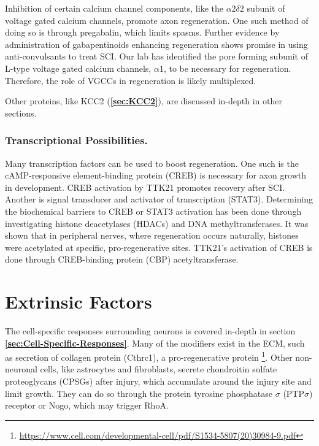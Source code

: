 \documentclass[12pt]{report}
\begin{document}
Inhibition of certain calcium channel components, like the $\alpha2\delta2$ subunit of voltage gated calcium channels, promote axon regeneration. One such method of doing so is through pregabalin, which limits spasms. Further evidence by administration of gabapentinoids enhancing regeneration shows promise in using anti-convulsants to treat SCI. Our lab has identified the pore forming subunit of L-type voltage gated calcium channels, $\alpha1$, to be necessary for regeneration. Therefore, the role of VGCCs in regeneration is likely multiplexed.\newline

Other proteins, like KCC2 (\textbf{\ref{sec:KCC2}}), are discussed in-depth in other sections. 

\subsubsection{Transcriptional Possibilities.}

Many transcription factors can be used to boost regeneration. One such is the cAMP-responsive element-binding protein (CREB) is necessary for axon growth in development. CREB activation by TTK21 promotes recovery after SCI. Another is signal transducer and activator of transcription (STAT3). Determining the biochemical barriers to CREB or STAT3 activation has been done through investigating histone deacetylases (HDACs) and DNA methyltransferases. It was shown that in peripheral nerves, where regeneration occurs naturally, histones were acetylated at specific, pro-regenerative sites. TTK21's activation of CREB is done through CREB-binding protein (CBP) acetyltransferase.  



\section{Extrinsic Factors}

The cell-specific responses surrounding neurons is covered in-depth in section \textbf{\ref{sec:Cell-Specific-Responses}}. Many of the modifiers exist in the ECM, such as secretion of collagen protein (Cthrc1), a pro-regenerative protein \footnote{\url{https://www.cell.com/developmental-cell/pdf/S1534-5807(20)30984-9.pdf}}. Other non-neuronal cells, like astrocytes and fibroblasts, secrete chondroitin sulfate proteoglycans (CPSGs) after injury, which accumulate around the injury site and limit growth. They can do so through the protein tyrosine phosphatase $\sigma$ (PTP$\sigma$) receptor or Nogo, which may trigger RhoA.\newline
\end{document}
